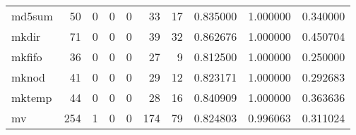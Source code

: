 \begin{longtable}{lrrrrrrrrr}
md5sum    &                                        50 &                                                  0 &                                                  0 &                                                  0 &                                                 33 &                                                 17 &                                           0.835000 &                               1.000000 &                             0.340000 \\
mkdir     &                                        71 &                                                  0 &                                                  0 &                                                  0 &                                                 39 &                                                 32 &                                           0.862676 &                               1.000000 &                             0.450704 \\
mkfifo    &                                        36 &                                                  0 &                                                  0 &                                                  0 &                                                 27 &                                                  9 &                                           0.812500 &                               1.000000 &                             0.250000 \\
mknod     &                                        41 &                                                  0 &                                                  0 &                                                  0 &                                                 29 &                                                 12 &                                           0.823171 &                               1.000000 &                             0.292683 \\
mktemp    &                                        44 &                                                  0 &                                                  0 &                                                  0 &                                                 28 &                                                 16 &                                           0.840909 &                               1.000000 &                             0.363636 \\
mv        &                                       254 &                                                  1 &                                                  0 &                                                  0 &                                                174 &                                                 79 &                                           0.824803 &                               0.996063 &                             0.311024 \\

\end{longtable}
